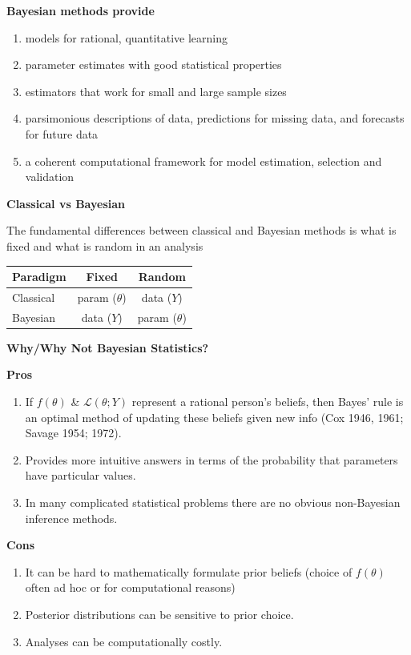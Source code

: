 \documentclass[12pt,xcolor=svgnames]{beamer}
\newcommand{\bl}{\color{blue}}
\newcommand{\theme}{\color{FireBrick}}
\newcommand{\sk}{\vspace{.4cm}}
\newcommand{\chap}[1]{{\theme \Large \bf #1} \sk}
\begin{document}
\begin{frame}
\chap{Bayesian methods provide} 

\begin{enumerate}
\item models for rational, quantitative learning
\item parameter estimates with good statistical properties
\item estimators that work for small and large sample sizes
\item parsimonious descriptions of data, predictions for missing data, and forecasts for future data
\item a coherent computational framework for model estimation, selection and validation
\end{enumerate}


\end{frame}



\begin{frame}
\chap{Classical vs Bayesian} 

The fundamental differences between classical and Bayesian methods is what is fixed and what is random in an analysis

\sk
\sk
\begin{center}
\begin{tabular}{|l|c|c|}
\hline
Paradigm & Fixed & Random \\
\hline
Classical & param ($\theta$) & data ($Y$)\\
\hline
Bayesian & data ($Y$) & param ($\theta$)\\
\hline
\end{tabular}
\end{center}
\end{frame}


\begin{frame}
\chap{Why/Why Not Bayesian Statistics?} 

{\footnotesize
{\bf \bl Pros}
\begin{enumerate}
\item If $f(\theta)$ \& $\mathcal{L}(\theta; Y)$ represent a rational person's beliefs, then Bayes' rule is an optimal method of updating these beliefs given new info (Cox 1946, 1961; Savage 1954; 1972).
\item Provides more intuitive answers in terms of the probability that parameters have particular values. 
\item In many complicated statistical problems there are no obvious non-Bayesian inference methods.
\end{enumerate}
{\bf \bl Cons}
\begin{enumerate}
\item It can be hard to mathematically formulate prior beliefs (choice of $f(\theta)$ often ad hoc or for computational reasons)
\item Posterior distributions can be sensitive to prior choice.
\item Analyses can be computationally costly.
\end{enumerate}
}

\end{frame}
\end{document}
